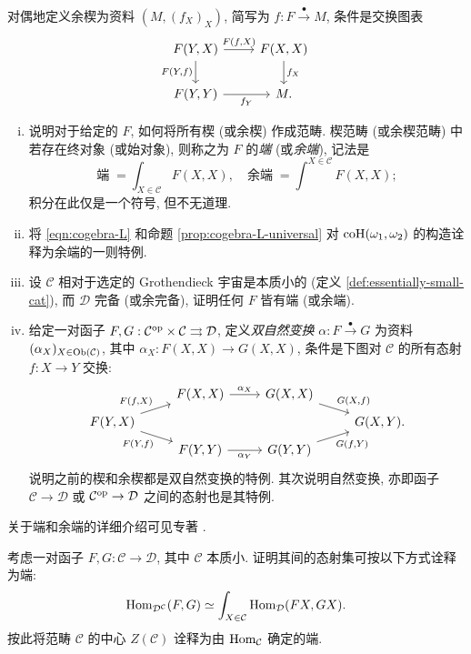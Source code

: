 \begin{Exercises}
	对偶地定义余楔为资料 $(M, (f_X)_X)$, 简写为 $f: F \xrightarrow{\bullet} M$, 条件是交换图表
	\[\begin{tikzcd}
		F(Y, X) \arrow[r, "{F(f, X)}"] \arrow[d, "{F(Y, f)}"'] & F(X, X) \arrow[d, "{f_X}"] \\
		F(Y, Y) \arrow[r, "{f_Y}"'] & M .
	\end{tikzcd}\]
	\begin{enumerate}[(i)]
		\item 说明对于给定的 $F$, 如何将所有楔 (或余楔) 作成范畴. 楔范畴 (或余楔范畴) 中若存在终对象 (或始对象), 则称之为 $F$ 的\emph{端} (或\emph{余端}), 记法是
		\[ \text{端}\; = \int_{X \in \mathcal{C}} F(X, X), \quad \text{余端}\; = \int^{X \in \mathcal{C}} F(X, X); \]
		积分在此仅是一个符号, 但不无道理.
		\item 将 \eqref{eqn:cogebra-L} 和命题 \ref{prop:cogebra-L-universal} 对 $\operatorname{coH}(\omega_1, \omega_2)$ 的构造诠释为余端的一则特例.
		\item 设 $\mathcal{C}$ 相对于选定的 Grothendieck 宇宙是本质小的 (定义 \ref{def:essentially-small-cat}), 而 $\mathcal{D}$ 完备 (或余完备), 证明任何 $F$ 皆有端 (或余端).
		\item 给定一对函子 $F, G: \mathcal{C}^{\operatorname{op}} \times \mathcal{C} \rightrightarrows \mathcal{D}$, 定义\emph{双自然变换} $\alpha: F \xrightarrow{\bullet} G$ 为资料 $(\alpha_X)_{X \in \operatorname{Ob}(\mathcal{C})}$, 其中 $\alpha_X: F(X, X) \to G(X, X)$, 条件是下图对 $\mathcal{C}$ 的所有态射 $f: X \to Y$ 交换:
		\[\begin{tikzcd}[row sep=tiny]
			& F(X, X) \arrow[r, "{\alpha_X}"] & G(X, X) \arrow[rd, "{G(X, f)}"] & \\
			F(Y, X) \arrow[ru, "{F(f, X)}"] \arrow[rd, "{F(Y, f)}"'] & & & G(X, Y). \\
			& F(Y, Y) \arrow[r, "{\alpha_Y}"'] & G(Y, Y) \arrow[ru, "{G(f, Y)}"'] &
		\end{tikzcd}\]
		说明之前的楔和余楔都是双自然变换的特例. 其次说明自然变换, 亦即函子 $\mathcal{C} \to \mathcal{D}$ 或 $\mathcal{C}^{\operatorname{op}} \to \mathcal{D}$ 之间的态射也是其特例.
	\end{enumerate}
	关于端和余端的详细介绍可见专著 \cite{Lor21}.
	
	\item 考虑一对函子 $F, G: \mathcal{C} \to \mathcal{D}$, 其中 $\mathcal{C}$ 本质小. 证明其间的态射集可按以下方式诠释为端:
	\[ \operatorname{Hom}_{\mathcal{D}^{\mathcal{C}}}(F, G) \simeq \int_{X \in \mathcal{C}} \operatorname{Hom}_{\mathcal{D}}(FX, GX). \]
	按此将范畴 $\mathcal{C}$ 的中心 $Z(\mathcal{C})$ 诠释为由 $\operatorname{Hom}_{\mathcal{C}}$ 确定的端.
	

\end{Exercises}
